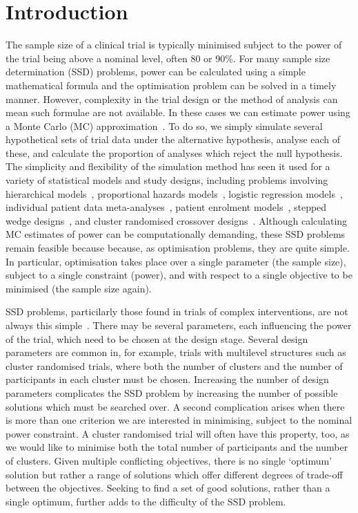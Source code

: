 \documentclass[]{sagej}
\begin{document}
\maketitle

\section{Introduction}\label{sec:intro}

The sample size of a clinical trial is typically minimised subject to the power of the trial being above a nominal level, often 80 or 90\%. For many sample size determination (SSD) problems, power can be calculated using a simple mathematical formula and the optimisation problem can be solved in a timely manner. However, complexity in the trial design or the method of analysis can mean such formulae are not available. In these cases we can estimate power using a Monte Carlo (MC) approximation~\cite{Arnold2011, Landau2013}. To do so, we simply simulate several hypothetical sets of trial data under the alternative hypothesis, analyse each of these, and calculate the proportion of analyses which reject the null hypothesis. The simplicity and flexibility of the simulation method has seen it used for a variety of statistical models and study designs, including problems involving hierarchical models~\cite{Feng1992, Hooper2013}, proportional hazards models~\cite{Schoenfeld2005}, logistic regression models~\cite{Grieve2016}, individual patient data meta-analyses~\cite{Sutton2007, Kontopantelis2016}, patient enrolment models~\cite{Fedorov2005}, stepped wedge designs~\cite{Baio2015, Hooper2016}, and cluster randomised crossover designs~\cite{Reich2012}. Although calculating MC estimates of power can be computationally demanding, these SSD problems remain feasible because because, as optimisation problems, they are quite simple. In particular, optimisation takes place over a single parameter (the sample size), subject to a single constraint (power), and with respect to a single objective to be minimised (the sample size again).

SSD problems, particilarly those found in trials of complex interventions, are not always this simple~\cite{Wilson2015}. There may be several parameters, each influencing the power of the trial, which need to be chosen at the design stage. Several design parameters are common in, for example, trials with multilevel structures such as cluster randomised trials, where both the number of clusters and the number of participants in each cluster must be chosen. Increasing the number of design parameters complicates the SSD problem by increasing the number of possible solutions which must be searched over. A second complication arises when there is more than one criterion we are interested in minimising, subject to the nominal power constraint. A cluster randomised trial will often have this property, too, as we would like to minimise both the total number of participants and the number of clusters. Given multiple conflicting objectives, there is no single `optimum' solution but rather a range of solutions which offer different degrees of trade-off between the objectives. Seeking to find a set of good solutions, rather than a single optimum, further adds to the difficulty of the SSD problem.
\end{document}
